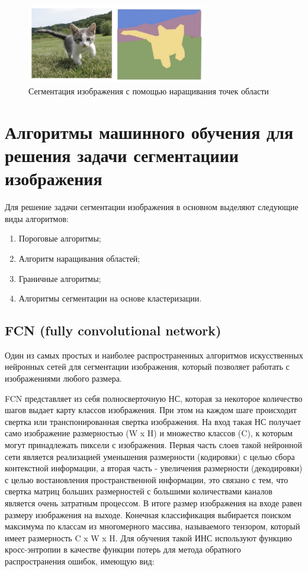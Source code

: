 \documentclass[bachelor, och, coursework]{shiza}
\begin{document}
\begin{figure}[H]
    \centering
    \includegraphics[width=0.7\textwidth]{7}
    \caption{Сегментация изображения с помощью наращивания точек области}
    \label{fig:img1}
\end{figure}

\section{Алгоритмы машинного обучения для решения задачи сегментациии изображения}

Для решение задачи сегментации изображения в основном выделяют следующие виды алгоритмов: 

\begin{enumerate}
    \item Пороговые алгоритмы; 
    \item Алгоритм наращивания областей; 
    \item Граничные алгоритмы;
    \item Алгоритмы сегментации на основе кластеризации.
\end{enumerate}

\subsection{FCN (fully convolutional network)}

Один из самых простых и наиболее распространенных алгоритмов искусственных нейронных сетей для сегментации изображения, который позволяет
работать с изображениями любого размера.

FCN представляет из себя полносверточную НС, которая за некоторое количество шагов выдает карту классов изображения. При этом на каждом шаге 
происходит свертка или транспонированная свертка изображения. На вход такая НС получает само изображение размерностью (W x H) и множество классов (C), к которым могут 
принадлежать пиксели с изображения. Первая часть слоев такой нейронной сети является реализацией уменьшения размерности (кодировки) с целью сбора контекстной
информации, а вторая часть - увеличения размерности (декодировки) с целью востановления пространственной информации, это связано с тем, что свертка матриц больших 
размерностей с большими количествами каналов является очень затратным процессом. В итоге размер изображения на входе равен размеру изображения на 
выходе. Конечная классификация выбирается поиском максимума по классам из многомерного массива, называемого тензором, который имеет размерность 
C x W x H. Для обучения такой ИНС используют функцию кросс-энтропии в качестве функции потерь для метода обратного распространения ошибок, имеющую вид:
\end{document}
